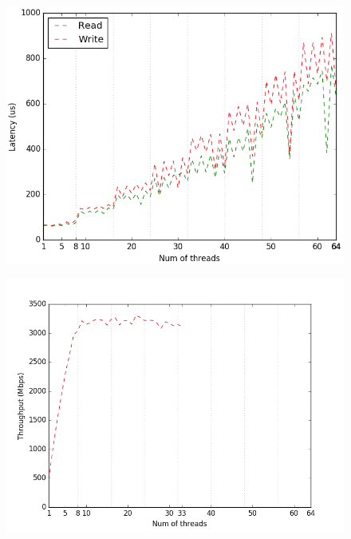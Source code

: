 \begin{figure}[H]
    \includegraphics[width=\columnwidth]{fig/latencyVsThreads}
    \caption{\todo{}}
    \label{fig:latencyVsThreads}
\end{figure}

\begin{figure}[H]
    \includegraphics[width=\columnwidth]{fig/throughputVsManyThreads}
    \caption{\todo{}}
    \label{fig:throughputVsManyThreads}
\end{figure}

